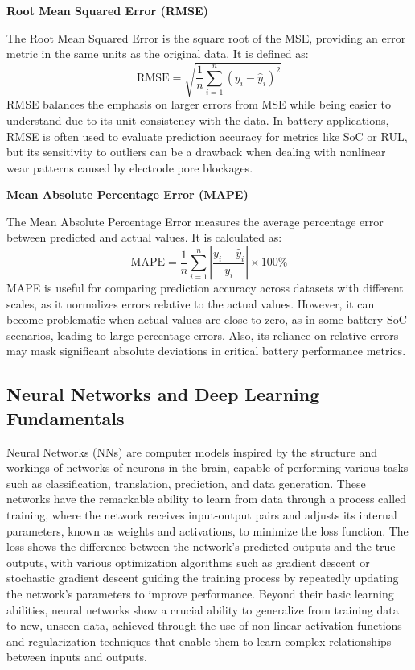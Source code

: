 \vspace{1cm}
\textbf{Root Mean Squared Error (RMSE)}

The Root Mean Squared Error is the square root of the MSE, providing an error metric in the same units as the original data. It is defined as:
\begin{equation}
\text{RMSE} = \sqrt{\frac{1}{n} \sum_{i=1}^{n} (y_i - \hat{y}_i)^2}
\end{equation}
RMSE balances the emphasis on larger errors from MSE while being easier to understand due to its unit consistency with the data. In battery applications, RMSE is often used to evaluate prediction accuracy for metrics like SoC or RUL, but its sensitivity to outliers can be a drawback when dealing with nonlinear wear patterns caused by electrode pore blockages.

\vspace{1cm}
\textbf{Mean Absolute Percentage Error (MAPE)}

The Mean Absolute Percentage Error measures the average percentage error between predicted and actual values. It is calculated as:
\begin{equation}
\text{MAPE} = \frac{1}{n} \sum_{i=1}^{n} \left| \frac{y_i - \hat{y}_i}{y_i} \right| \times 100\%
\end{equation}
MAPE is useful for comparing prediction accuracy across datasets with different scales, as it normalizes errors relative to the actual values. However, it can become problematic when actual values are close to zero, as in some battery SoC scenarios, leading to large percentage errors. Also, its reliance on relative errors may mask significant absolute deviations in critical battery performance metrics.

\vspace{1cm}
\subsection{Neural Networks and Deep Learning Fundamentals}

Neural Networks (NNs) are computer models inspired by the structure and workings of networks of neurons in the brain, capable of performing various tasks such as classification, translation, prediction, and data generation. These networks have the remarkable ability to learn from data through a process called training, where the network receives input-output pairs and adjusts its internal parameters, known as weights and activations, to minimize the loss function. The loss shows the difference between the network's predicted outputs and the true outputs, with various optimization algorithms such as gradient descent or stochastic gradient descent guiding the training process by repeatedly updating the network's parameters to improve performance. Beyond their basic learning abilities, neural networks show a crucial ability to generalize from training data to new, unseen data, achieved through the use of non-linear activation functions and regularization techniques that enable them to learn complex relationships between inputs and outputs.

